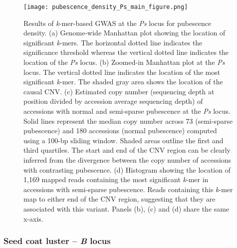 \begin{figure}
	\centering
	\texttt{[image: pubescence\_density\_Ps\_main\_figure.png]}
	\caption[Results of \textit{k}-mer-based GWAS at the
	\textit{Ps} locus for pubescence density.]{Results of \textit{k}-mer-based GWAS at the
	\textit{Ps} locus for pubescence density.
	(a) Genome-wide Manhattan plot showing the location of significant \textit{k}-mers. The
	horizontal dotted line indicates the significance threshold whereas the
	vertical dotted line indicates the location of the \textit{Ps} locus.
	(b) Zoomed-in Manhattan plot at the \textit{Ps} locus. The
	vertical dotted line indicates the location of the most significant
	\textit{k}-mer. The shaded gray area shows the location of the causal CNV.
	(c) Estimated copy number (sequencing depth at position divided by
	accession average sequencing depth) of accessions with normal and
	semi-sparse pubescence at the \textit{Ps} locus. Solid lines represent
	the median copy number across 73 (semi-sparse pubescence) and 180
	accessions (normal pubescence) computed using a 100-bp sliding window.
	Shaded areas outline the first and third quartiles. The start and end
	of the CNV region can be clearly inferred from the divergence between
	the copy number of accessions with contrasting pubescence.
	(d) Histogram showing the location of 1,169 mapped reads containing the
	most significant \textit{k}-mer in accessions with semi-sparse pubescence.
	Reads containing this \textit{k}-mer map to either end of the CNV
	region, suggesting that they are associated with this variant. Panels
	(b), (c) and (d) share the same x-axis.}
	\label{pubescence-density-main-figure}
\end{figure}

\subsubsection*{Seed coat luster -- \textit{B} locus}
\label{sv-gwas-main-results-seed-coat-luster-b}

